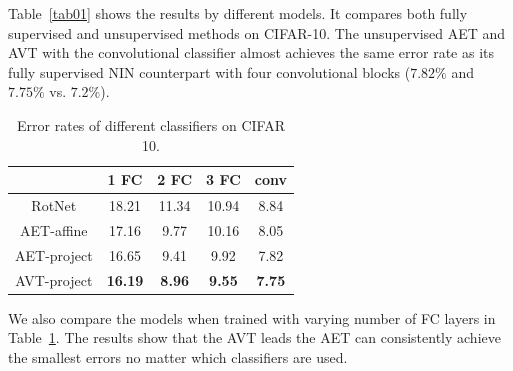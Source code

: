 \documentclass[10pt,journal,compsoc,twoside]{IEEEtran}
\begin{document}
Table~\ref{tab01} shows the results by different models. It compares both fully supervised and unsupervised methods on CIFAR-10. The unsupervised AET and AVT with the convolutional classifier almost achieves the same error rate as its fully supervised NIN counterpart with four convolutional blocks ($7.82\%$ and $7.75\%$ vs. $7.2\%$).



\begin{table}
\caption{Error rates of different classifiers on CIFAR 10.}\label{tab02}
\centering
 \begin{tabular}{c|cccc} \toprule
   &1 FC&2 FC&3 FC&conv\\ \midrule
RotNet \cite{gidaris2018unsupervised}&18.21&11.34&10.94 &8.84 \\\midrule
AET-affine  &17.16 &9.77 &10.16 &8.05\\
AET-project &16.65 &9.41 &9.92 &7.82 \\ \midrule
AVT-project &\textbf{16.19} &\textbf{8.96} &\textbf{9.55} &\textbf{7.75}\\\bottomrule
\end{tabular}
\end{table}

We also compare the models when trained with varying number of FC layers in Table~\ref{tab02}. The results show that the AVT leads the AET can consistently achieve the smallest errors no matter which classifiers are used.


\end{document}
